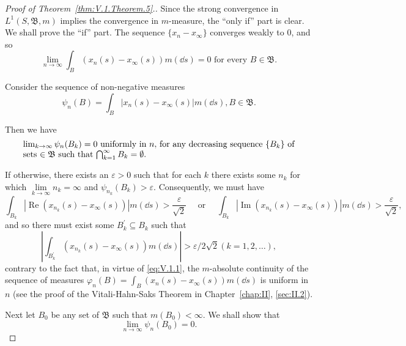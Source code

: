 \begin{proof}[Proof of Theorem~\ref{thm:V.1.Theorem.5}.]
Since the strong convergence in $L^1(S, \mathfrak{B}, m)$ implies the convergence in $m$-measure, the ``only if'' part is clear. We shall prove the ``if'' part. The sequence $\{x_n - x_\infty\}$ converges weakly to $0$, and so
\begin{equation}\label{eq:V.1.1}
\lim\limits _{n \rightarrow \infty} \int_{B} \left(x _{n} (s) - x _{\infty} (s)\right) m (\dd s) = 0 \text{ for every } B \in \mathfrak {B}.
\end{equation}

Consider the sequence of non-negative measures 
\[
\psi_{n} (B) = \int_{B} | x _{n} (s) - x _{\infty} (s) | m (\dd s), B \in \mathfrak {B}.
\]

Then we have 
\begin{equation}
\label{eq:V.1.2}
\begin{minipage}{0.92\linewidth}
\everymath{}\let\limits\nolimits
$\lim\limits_{k \to \infty} \psi_n(B_k) = 0$ uniformly in $n,$ for any decreasing sequence $\{B_k\}$ of sets $\in \mathfrak{B}$ such that $\bigcap\limits_{k=1}^{\infty} B_k = \emptyset.$
\end{minipage}
\end{equation}


If otherwise, there exists an $\varepsilon > 0$ such that for each $k$ there exists some $n_{k}$ for which $\lim\limits_{k\to \infty}n_k = \infty$ and $\psi_{n_{k}}(B_k) > \varepsilon$. Consequently, we must have 
\[
\int_ {B _{k}} \left| \operatorname{Re} \left(x _ {n _{k}} (s) - x _{\infty} (s)\right) \right| m (\dd s) > \frac {\varepsilon}{\sqrt {2}} \quad \text{ or } \quad \int_ {B _{k}} \left| \operatorname{Im} \left(x _ {n _{k}} (s) - x _{\infty} (s)\right) \right| m (\dd s) > \frac {\varepsilon}{\sqrt {2}},
\]
and so there must exist some $B_{k}^{\prime} \subseteq B_{k}$ such that 
\[
\left| \int_ {B _{k} ^{\prime}} (x _ {n _{k}} (s) - x _{\infty} (s)) m (\dd s) \right| > \varepsilon / 2 \sqrt {2} (k = 1, 2, \dots),
\]
contrary to the fact that, in virtue of \eqref{eq:V.1.1}, the $m$-absolute continuity of the sequence of measures $\varphi_{n}(B) = \int_{B} (x_{n}(s) - x_{\infty}(s)) m(\dd s)$ is uniform in $n$ (see the proof of the Vitali-Hahn-Saks Theorem in Chapter~\ref{chap:II}, \ref{sec:II.2}). 

Next let $B_0$ be any set of $\mathfrak{B}$ such that $m(B_0) < \infty$. We shall show that 
\begin{equation}\label{eq:V.1.3}
\lim\limits _{n \rightarrow \infty} \psi_{n} (B _{0}) = 0.
\end{equation}


\end{proof}
